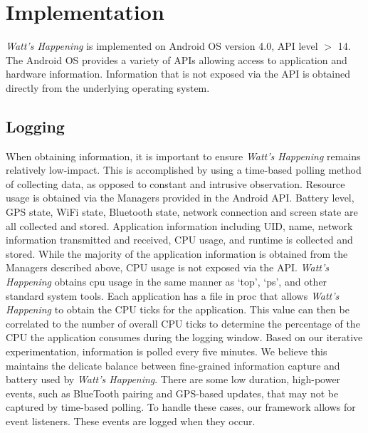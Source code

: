 \section{Implementation}
\label{sec:implementation}
\emph{Watt's Happening} is implemented on Android OS version 4.0, API level $>$ 14. 
The Android OS provides a variety of APIs allowing access to application and hardware information.
Information that is not exposed via the API is obtained directly from the underlying operating system.

\subsection{Logging}
\label{subsec:impl_logging}
When obtaining information, it is important to ensure \emph{Watt's Happening} remains relatively low-impact.
This is accomplished by using a time-based polling method of collecting data, as opposed to constant and intrusive observation.
Resource usage is obtained via the Managers provided in the Android API.
Battery level, GPS state, WiFi state, Bluetooth state, network connection and screen state are all collected and stored.
Application information including UID, name, network information transmitted and received, CPU usage, and runtime is collected and stored. 
While the majority of the application information is obtained from the Managers described above, CPU usage is not exposed via the API.
\emph{Watt's Happening} obtains cpu usage in the same manner as `top', `ps', and other standard system tools.
Each application has a file in proc that allows \emph{Watt's Happening} to obtain the CPU ticks for the application.
This value can then be correlated to the number of overall CPU ticks to determine the percentage of the CPU the application consumes during the logging window.
Based on our iterative experimentation, information is polled every five minutes.
We believe this maintains the delicate balance between fine-grained information capture and battery used by \emph{Watt's Happening}.
There are some low duration, high-power events, such as BlueTooth pairing and GPS-based updates, that may not be captured by time-based polling.
To handle these cases, our framework allows for event listeners.
These events are logged when they occur. 

